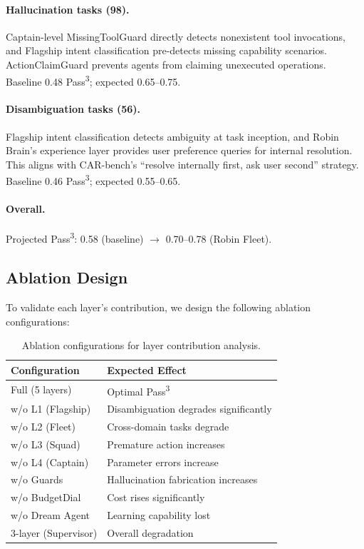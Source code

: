 \documentclass{article}
\begin{document}
\paragraph{Hallucination tasks (98).} Captain-level MissingToolGuard directly detects nonexistent tool invocations, and Flagship intent classification pre-detects missing capability scenarios. ActionClaimGuard prevents agents from claiming unexecuted operations. Baseline 0.48 Pass\textsuperscript{3}; expected 0.65--0.75.

\paragraph{Disambiguation tasks (56).} Flagship intent classification detects ambiguity at task inception, and Robin Brain's experience layer provides user preference queries for internal resolution. This aligns with CAR-bench's ``resolve internally first, ask user second'' strategy. Baseline 0.46 Pass\textsuperscript{3}; expected 0.55--0.65.

\paragraph{Overall.} Projected Pass\textsuperscript{3}: 0.58 (baseline) $\rightarrow$ 0.70--0.78 (Robin Fleet).

\subsection{Ablation Design}

To validate each layer's contribution, we design the following ablation configurations:

\begin{table}[t]
\centering
\caption{Ablation configurations for layer contribution analysis.}
\label{tab:ablation}
\small
\begin{tabular}{ll}
\toprule
\textbf{Configuration} & \textbf{Expected Effect} \\
\midrule
Full (5 layers) & Optimal Pass\textsuperscript{3} \\
w/o L1 (Flagship) & Disambiguation degrades significantly \\
w/o L2 (Fleet) & Cross-domain tasks degrade \\
w/o L3 (Squad) & Premature action increases \\
w/o L4 (Captain) & Parameter errors increase \\
w/o Guards & Hallucination fabrication increases \\
w/o BudgetDial & Cost rises significantly \\
w/o Dream Agent & Learning capability lost \\
3-layer (Supervisor) & Overall degradation \\
\bottomrule
\end{tabular}
\end{table}
\end{document}
